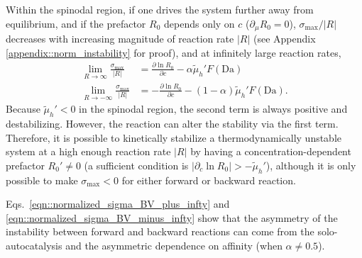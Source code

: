 \documentclass[reprint,aps,pre,superscriptaddress]{revtex4-2}
\newcommand{\pderiv}[2]{\frac{\partial {#1}}{\partial {#2}}}
\let\originalleft\left
\let\originalright\right
\renewcommand{\left}{\mathopen{}\mathclose\bgroup\originalleft}
\renewcommand{\right}{\aftergroup\egroup\originalright}
\begin{document}
Within the spinodal region, if one drives the system further away from equilibrium, and if the prefactor $R_0$ depends only on $c$ ($\partial_\mu R_0=0$), $\sigma_\text{max}/|R|$ decreases with increasing magnitude of reaction rate $|R|$ (see Appendix \ref{appendix::norm_instability} for proof), and at infinitely large reaction rates,
\begin{align}
  \lim_{R\to\infty}{\frac{\sigma_\text{max}}{|R|}} &= \pderiv{\ln{R_0}}{c} - \alpha \tilde{\mu}_h'F(\text{Da})  \label{eqn::normalized_sigma_BV_plus_infty} \\
  \lim_{R\to-\infty}{\frac{\sigma_\text{max}}{|R|}} &= -\pderiv{\ln{R_0}}{c} - (1-\alpha) \tilde{\mu}_h'F(\text{Da})   \label{eqn::normalized_sigma_BV_minus_infty}.
\end{align}
Because $\tilde{\mu}_h'<0$ in the spinodal region, the second term is always positive and destabilizing. However, the reaction can alter the stability via the first term. Therefore, it is possible to kinetically stabilize a thermodynamically unstable system at a high enough reaction rate $|R|$ by having a concentration-dependent prefactor $R_0' \neq 0$ (a sufficient condition is $|\partial_c \ln{R_0}|> -\tilde{\mu}_h'$), although it is only possible to make $\sigma_\text{max}<0$ for either forward or backward reaction.

Eqs.~\ref{eqn::normalized_sigma_BV_plus_infty} and \ref{eqn::normalized_sigma_BV_minus_infty} show that the asymmetry of the instability between forward and backward reactions can come from the solo-autocatalysis and the asymmetric dependence on affinity (when $\alpha\neq 0.5$).


\end{document}
